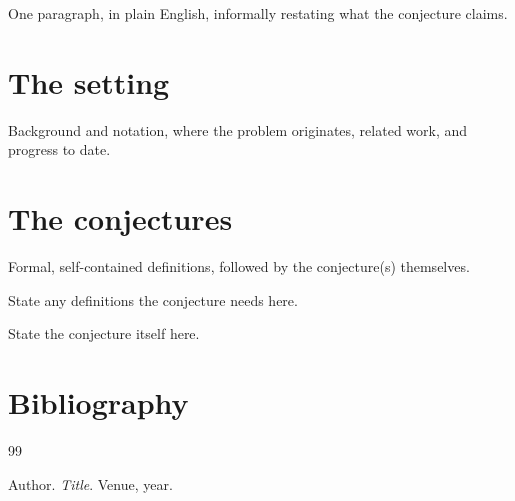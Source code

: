 \documentclass{conjura-conjecture}
\begin{document}

\vspace{0.4em}

\begin{informalconjecture}
One paragraph, in plain English, informally restating what the
conjecture claims.
\end{informalconjecture}

\section{The setting}\label{sec:setting}

Background and notation, where the problem originates, related
work, and progress to date.

\section{The conjectures}\label{sec:conjectures}

Formal, self-contained definitions, followed by the conjecture(s)
themselves.

\begin{definition}[name]\label{def:example}
State any definitions the conjecture needs here.
\end{definition}

\begin{conjecture}[name]\label{conj:main}
State the conjecture itself here.
\end{conjecture}

\section{Bibliography}

\begin{conjurabibliography}{99}

Author.
\emph{Title}.
Venue, year.

\end{conjurabibliography}
\end{document}
